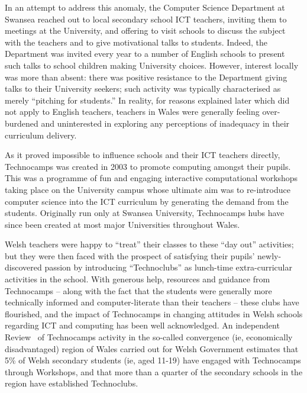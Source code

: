 \documentclass{sig-alternate}
\begin{document}
In an attempt to address this anomaly,
the Computer Science Department at Swansea reached out
to local secondary school ICT teachers,
inviting them to meetings at the University,
and offering to visit schools to discuss
the subject with the teachers and to give
motivational talks to students.
Indeed, the Department was invited every year to
a number of English schools to present such talks
to school children making University choices.
However, interest locally was more than absent:
there was positive resistance to the Department
giving talks to their University seekers;
such activity was typically characterised as merely ``pitching for students.''
In reality, for reasons explained later
which did not apply to English teachers,
teachers in Wales were generally feeling over-burdened and
uninterested in exploring any perceptions
of inadequacy in their curriculum delivery.

As it proved impossible to influence schools and their ICT teachers directly,
Technocamps was created in 2003 to promote computing amongst their pupils.
This was a programme of fun and engaging interactive computational workshops
taking place on the University campus
whose ultimate aim was to re-introduce computer science into
the ICT curriculum by generating the demand from the students.
Originally run only at Swansea University,
Technocamps hubs have since been created at most major Universities
throughout Wales.

Welsh teachers were happy to ``treat'' their classes
to these ``day out'' activities; but they were then faced with
the prospect of satisfying their pupils' newly-discovered passion
by introducing ``Technoclubs'' as lunch-time
extra-curricular activities in the school.
With generous help, resources and guidance from Technocamps
-- along with the fact that the students were generally
more technically informed and computer-literate than their teachers -- 
these clubs have flourished, and the impact of Technocamps
in changing attitudes in Welsh schools regarding ICT and computing
has been well acknowledged.
An independent Review~\cite{Wavehill:2015}
of Technocamps activity in the so-called convergence
(ie, economically disadvantaged) region of Wales
carried out for Welsh Government estimates that
5\% of Welsh secondary students (ie, aged 11-19)
have engaged with Technocamps through Workshops,
and that more than a quarter of the secondary schools
in the region have established Technoclubs.

\end{document}
